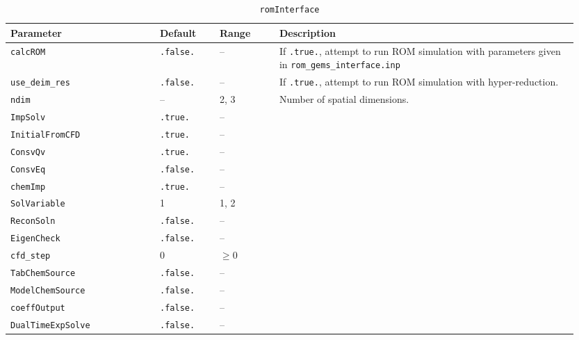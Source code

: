 \begin{table}[H]
    \centering
    \begin{tabular}{p{0.25\linewidth} p{0.1\linewidth} p{0.1\linewidth} p{0.5\linewidth}}
        \toprule
        Parameter & Default & Range & Description \\
        \midrule
        \verb|calcROM| & \verb|.false.| & -- & If \verb|.true.|, attempt to run ROM simulation with parameters given in \verb|rom_gems_interface.inp| \\
        \verb|use_deim_res| & \verb|.false.| & -- & If \verb|.true.|, attempt to run ROM simulation with hyper-reduction. \\
        \verb|ndim| & -- & 2, 3 & Number of spatial dimensions. \\
        \verb|ImpSolv| & \verb|.true.| & -- &  \\
        \verb|InitialFromCFD| & \verb|.true.| & -- &  \\
        \verb|ConsvQv| & \verb|.true.| & -- &  \\
        \verb|ConsvEq| & \verb|.false.| & -- &  \\
        \verb|chemImp| & \verb|.true.| & -- &  \\
        \verb|SolVariable| & 1 & 1, 2 &  \\
        \verb|ReconSoln|  & \verb|.false.| & -- &  \\
        \verb|EigenCheck| & \verb|.false.| & -- &  \\
        \verb|cfd_step| & 0 & $\ge 0$ &  \\
        \verb|TabChemSource| & \verb|.false.| & -- &  \\
        \verb|ModelChemSource| & \verb|.false.| & -- &  \\
        \verb|coeffOutput| & \verb|.false.| & -- &  \\
        \verb|DualTimeExpSolve| & \verb|.false.| & -- &  \\
        \bottomrule 
    \end{tabular}
    \caption{\texttt{romInterface}}
\end{table}

